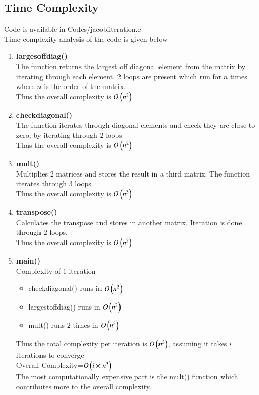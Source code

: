 \documentclass[journal,12pt,onecolumn]{IEEEtran}
\theoremstyle{remark}
\begin{document}
\subsection{\textbf{Time Complexity}}
Code is available in Codes/jacobi\textunderscore iteration.c\\

Time complexity analysis of the code is given below\\
\begin{enumerate}
    \item \textbf{larges\textunderscore off\textunderscore diag()}\\
    The function returns the largest off diagonal element from the matrix by iterating through each element. $2$ loops are present which run for $n$ times where $n$ is the order of the matrix.\\
    Thus the overall complexity is $O\left(n^2\right)$\\
    \item \textbf{check\textunderscore diagonal()}\\
    The function iterates through diagonal elements and check  they are close to zero, by iterating through $2$ loops \\
    Thus the overall complexity is $O\left(n^2\right)$\\
    \item \textbf{mult()}\\
     Multiplies $2$ matrices and stores the result in a third matrix. The function iterates through 3 loops.\\
     Thus the overall complexity is $O\left(n^3\right)$\\
     \item \textbf{transpose()}\\
     Calculates the transpose and stores in another matrix. Iteration is done through $2$ loops.\\
     Thus the overall complexity is $O\left(n^2\right)$\\
     \item \textbf{main()}\\
     Complexity of $1$ iteration\\
     \begin{itemize}
         \item check\textunderscore diagonal() runs in $O\left(n^2\right)$
         \item largest\textunderscore off\textunderscore diag() runs in $O\left(n^2\right)$
         \item mult() runs $2$ times in $O\left(n^3\right)$
     \end{itemize}
     Thus the total complexity per iteration is $O\left(n^3\right)$,
     assuming it takes $i$ iterations to converge\\
     Overall Complexity=$O\left(i \times n^3\right)$\\
     The most computationally expensive part is the mult() function which contributes more to the overall complexity.
\end{enumerate}
\end{document}
